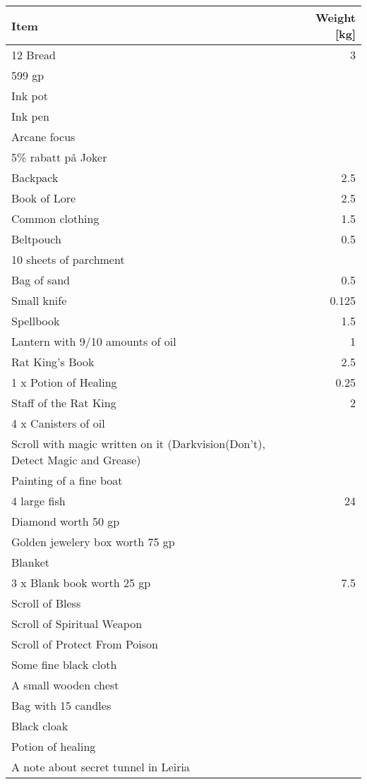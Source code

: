 \documentclass[11pt]{article}
\begin{document}
\noindent \begin{tabularx}{\textwidth}{X|r}
Item & Weight [kg] \\
\hline
12 Bread \dotfill 							& 3 	\\
599 gp										& 		\\
Ink pot 									& 		\\
Ink pen 									& 		\\
Arcane focus 								& 		\\
5\% rabatt på Joker 						& 		\\
Backpack \dotfill 							& 2.5 	\\
Book of Lore \dotfill 						& 2.5 	\\
Common clothing \dotfill 					& 1.5 	\\
Beltpouch \dotfill 							& 0.5 	\\
10 sheets of parchment 						& 		\\
Bag of sand \dotfill 						& 0.5 	\\
Small knife \dotfill 						& 0.125 \\
Spellbook \dotfill 							& 1.5 	\\
Lantern with 9/10 amounts of oil \dotfill 	& 1 	\\
Rat King's Book \dotfill 					& 2.5 	\\
1 x Potion of Healing \dotfill				& 0.25	\\
Staff of the Rat King \dotfill				& 2		\\
4 x Canisters of oil						&		\\
Scroll with magic written on it	(Darkvision(Don't), Detect Magic and Grease)			&		\\
Painting of a fine boat						&		\\
4 large fish \dotfill						& 24	\\
Diamond worth 50 gp							&		\\
Golden jewelery box worth 75 gp				&		\\
Blanket										&		\\
3 x Blank book worth 25 gp \dotfill			& 7.5	\\
Scroll of Bless								& 		\\
Scroll of Spiritual Weapon					&		\\
Scroll of Protect From Poison				&		\\
Some fine black cloth						&		\\
A small wooden chest						&		\\
Bag with 15 candles							&		\\
Black cloak									&		\\
Potion of healing							&		\\
A note about secret tunnel in Leiria		&		\\
	\end{tabularx}
\end{document}
